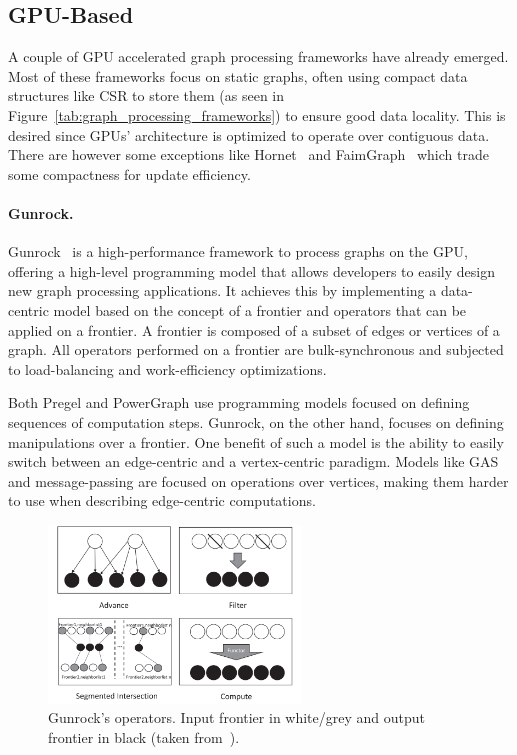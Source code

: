     \subsection{GPU-Based}
    \label{sec:gpu_graph_processing}
    
    A couple of \gls{GPU} accelerated graph processing frameworks have already emerged. Most of these frameworks focus on static graphs, often using compact data structures like \gls{CSR} to store them (as seen in Figure~\ref{tab:graph_processing_frameworks}) to ensure good data locality. This is desired since \gls{GPU}s' architecture is optimized to operate over contiguous data. There are however some exceptions like Hornet~\cite{paper:hornet} and FaimGraph~\cite{paper:faimgraph} which trade some compactness for update efficiency.

    \paragraph{\textbf{Gunrock}.} 
    Gunrock~\cite{paper:gunrock} is a high-performance framework to process graphs on the \gls{GPU}, offering a high-level programming model that allows developers to easily design new graph processing applications. It achieves this by implementing a data-centric model based on the concept of a frontier and operators that can be applied on a frontier. A frontier is composed of a subset of edges or vertices of a graph. All operators performed on a frontier are bulk-synchronous and subjected to load-balancing and work-efficiency optimizations.

    Both Pregel and PowerGraph use programming models focused on defining sequences of computation steps. Gunrock, on the other hand, focuses on defining manipulations over a frontier. One benefit of such a model is the ability to easily switch between an edge-centric and a vertex-centric paradigm. Models like \gls{GAS} and message-passing are focused on operations over vertices, making them harder to use when describing edge-centric computations.

    \begin{figure}%
      \centering
        \includegraphics[width=0.6\textwidth]{Chapters/Figures/Images/gunrock_ops_updated.png}
        \caption{Gunrock's operators. Input frontier in white/grey and output frontier in black (taken from~\cite{paper:gunrock}).}
    \label{fig:gunrockops}
    \end{figure}

